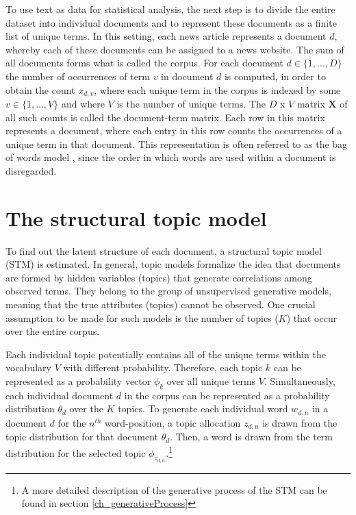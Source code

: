 \documentclass[12pt,a4paper,notitlepage]{article}
\begin{document}
To use text as data for statistical analysis, the next step is to divide the entire dataset into individual documents and to represent these documents as a finite list of unique terms. In this setting, each news article represents a document $d$, whereby each of these documents can be assigned to a news website. The sum of all documents forms what is called the corpus. For each document $d \in \lbrace 1,...,D \rbrace$ the number of occurrences of term $v$ in document $d$ is computed, in order to obtain the count $x_{d,v}$, where each unique term in the corpus is indexed by some $v \in \lbrace 1,...,V \rbrace$ and where $V$ is the number of unique terms. The $D$ x $V$ matrix $\boldsymbol{X}$ of all such counts is called the document-term matrix. Each row in this matrix represents a document, where each entry in this row counts the occurrences of a unique term in that document. This representation is often referred to as the bag of words model \citep{gentzkow_text_2017}, since the order in which words are used within a document is disregarded.
 
\section{The structural topic model}\label{ch_model}

To find out the latent structure of each document, a structural topic model (STM) is estimated. In general, topic models formalize the idea that documents are formed by hidden variables (topics) that generate correlations among observed terms. They belong to the group of unsupervised generative models, meaning that the true attributes (topics) cannot be observed. One crucial assumption to be made for such models is the number of topics ($K$) that occur over the entire corpus. 

Each individual topic potentially contains all of the unique terms within the vocabulary $V$ with different probability. Therefore, each topic $k$ can be represented as a probability vector $\phi_k$ over all unique terms $V$. Simultaneously, each individual document $d$ in the corpus can be represented as a probability distribution $\theta_d$ over the $K$ topics. To generate each individual word $w_{d,n}$ in a document $d$ for the $n^{th}$ word-position, a topic allocation $z_{d,n}$ is drawn from the topic distribution for that document $\theta_d$. Then, a word is drawn from the term distribution for the selected topic $\phi_{z_{d,n}}$.\footnote{A more detailed description of the generative process of the STM can be found in section \ref{ch_generativeProcess}}
\end{document}
